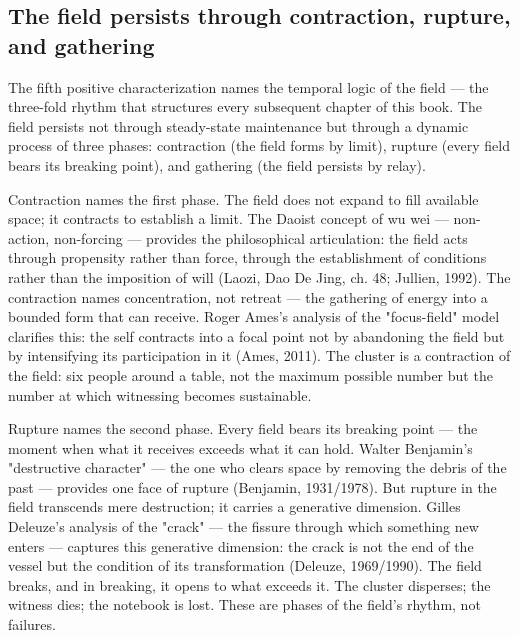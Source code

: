 \subsection{The field persists through contraction, rupture, and gathering}

The fifth positive characterization names the temporal logic of the field — the three-fold rhythm that structures every subsequent chapter of this book. The field persists not through steady-state maintenance but through a dynamic process of three phases: contraction (the field forms by limit), rupture (every field bears its breaking point), and gathering (the field persists by relay).

Contraction names the first phase. The field does not expand to fill available space; it contracts to establish a limit. The Daoist concept of wu wei — non-action, non-forcing — provides the philosophical articulation: the field acts through propensity rather than force, through the establishment of conditions rather than the imposition of will (Laozi, Dao De Jing, ch. 48; Jullien, 1992). The contraction names concentration, not retreat — the gathering of energy into a bounded form that can receive. Roger Ames's analysis of the "focus-field" model clarifies this: the self contracts into a focal point not by abandoning the field but by intensifying its participation in it (Ames, 2011). The cluster is a contraction of the field: six people around a table, not the maximum possible number but the number at which witnessing becomes sustainable.

Rupture names the second phase. Every field bears its breaking point — the moment when what it receives exceeds what it can hold. Walter Benjamin's "destructive character" — the one who clears space by removing the debris of the past — provides one face of rupture (Benjamin, 1931/1978). But rupture in the field transcends mere destruction; it carries a generative dimension. Gilles Deleuze's analysis of the "crack" — the fissure through which something new enters — captures this generative dimension: the crack is not the end of the vessel but the condition of its transformation (Deleuze, 1969/1990). The field breaks, and in breaking, it opens to what exceeds it. The cluster disperses; the witness dies; the notebook is lost. These are phases of the field's rhythm, not failures.

